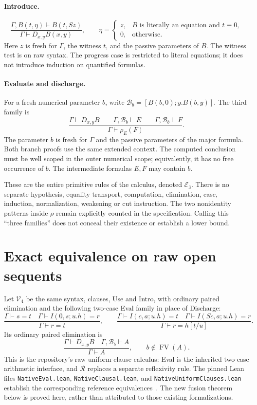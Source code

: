\documentclass[11pt,letterpaper]{article}
\theoremstyle{definition}\newtheorem{definition}[theorem]{Definition}
\theoremstyle{remark}\newtheorem{remark}[theorem]{Remark}
\begin{document}
\paragraph{Introduce.}
\[
 \frac{\Gamma,B(t,\eta)\vdash B(t,Sz)}
      {\Gamma\vdash D_{x,y}B(x,y)},\qquad
 \eta=\begin{cases}
 z,&B\text{ is literally an equation and }t\equiv0,\\
 0,&\text{otherwise}.
 \end{cases}
 \tag{Intro}\label{eq:raw-intro}
\]
Here $z$ is fresh for $\Gamma$, the witness $t$, and the passive parameters
of $B$. The witness test is on raw syntax. The progress case is restricted
to literal equations; it does not introduce induction on quantified formulas.

\paragraph{Evaluate and discharge.}
For a fresh numerical parameter $b$, write
$\mathcal B_b=[B(b,0);y.B(b,y)]$. The third family is
\[
 \frac{\Gamma\vdash D_{x,y}B\qquad
       \Gamma,\mathcal B_b\vdash E\qquad
       \Gamma,\mathcal B_b\vdash F}
      {\Gamma\vdash\rho_E(F)}.
 \tag{Discharge}\label{eq:raw-discharge}
\]
The parameter $b$ is fresh for $\Gamma$ and the passive parameters of the
major formula. Both branch proofs use the same extended context. The
computed conclusion must be well scoped in the outer numerical scope;
equivalently, it has no free occurrence of $b$. The intermediate formulas
$E,F$ may contain $b$.

These are the entire primitive rules of the calculus, denoted $\mathcal E_3$.
There is no separate hypothesis, equality transport, computation,
elimination, case, induction, normalization, weakening or cut instruction.
The two nonidentity patterns inside $\rho$ remain explicitly counted in
the specification. Calling this ``three families'' does not conceal their
existence or establish a lower bound.

\section{Exact equivalence on raw open sequents}
\label{sec:raw-equivalence}

Let $\mathcal V_4$ be the same syntax, clauses, Use and Intro, with ordinary
paired elimination and the following two-case Eval family in place of
Discharge:
\[
 \frac{\Gamma\vdash s=t\quad\Gamma\vdash I(0,s;u.h)=r}
      {\Gamma\vdash r=t},\qquad
 \frac{\Gamma\vdash I(c,a;u.h)=t\quad
       \Gamma\vdash I(Sc,a;u.h)=r}
      {\Gamma\vdash r=h[t/u]}.
\]
Its ordinary paired elimination is
\[
 \frac{\Gamma\vdash D_{x,y}B\quad
       \Gamma,\mathcal B_b\vdash A}
      {\Gamma\vdash A},\qquad b\notin\operatorname{FV}(A).
\]
This is the repository's raw uniform-clause calculus: Eval is the inherited
two-case arithmetic interface, and $\mathcal R$ replaces a separate
reflexivity rule. The pinned Lean files \texttt{NativeEval.lean},
\texttt{NativeClausal.lean}, and \texttt{NativeUniformClauses.lean}
establish the corresponding reference equivalences~\cite{repo,rawformal}.
The new fusion theorem below is proved here, rather than attributed to
those existing formalizations.
\end{document}
